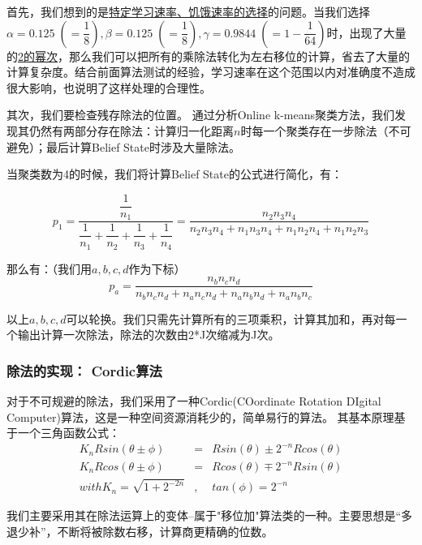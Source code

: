 首先，我们想到的是\uline{特定学习速率、饥饿速率的选择}的问题。当我们选择$\alpha = 0.125\;(=\dfrac{1}{8}),\beta = 0.125\;(=\dfrac{1}{8}), \gamma = 0.9844 \;(= 1- \dfrac{1}{64})$时，出现了大量的\uline{2的幂次}，那么我们可以把所有的乘除法转化为左右移位的计算，省去了大量的计算复杂度。结合前面算法测试的经验，学习速率在这个范围以内对准确度不造成很大影响，也说明了这样处理的合理性。

其次，我们要检查残存除法的位置。 通过分析Online k-means聚类方法，我们发现其仍然有两部分存在除法：计算归一化距离$n$时每一个聚类存在一步除法（不可避免）；最后计算Belief State时涉及大量除法。

当聚类数为4的时候，我们将计算Belief State的公式进行简化，有：

$$p_1 = \dfrac{\dfrac{1}{n_1}}{\dfrac{1}{n_1}+\dfrac{1}{n_2}+\dfrac{1}{n_3}+\dfrac{1}{n_4}} = \dfrac{n_2 n_3 n_4}{n_2 n_3 n_4 + n_1 n_3 n_4 + n_1 n_2 n_4 + n_1 n_2 n_3}$$

那么有：（我们用$a,b,c,d$作为下标）
\begin{equation}
p_a = \dfrac{n_b n_c n_d}{n_b n_c n_d + n_a n_c n_d + n_a n_b n_d + n_a n_b n_c}
\end{equation}

以上$a,b,c,d$可以轮换。我们只需先计算所有的三项乘积，计算其加和，再对每一个输出计算一次除法，除法的次数由2*J次缩减为J次。

\subsubsection{除法的实现： Cordic算法}

对于不可规避的除法，我们采用了一种Cordic(COordinate Rotation DIgital Computer)算法，这是一种空间资源消耗少的，简单易行的算法。 其基本原理基于一个三角函数公式：
\begin{equation}
\begin{aligned}
K_n R sin(\theta \pm \phi) & = & R sin(\theta) \pm 2^{-n} R cos(\theta) \\
K_n R cos(\theta \pm \phi) & = & R cos(\theta) \mp 2^{-n} R sin(\theta) \\
with K_n = \sqrt{1+2^{-2n}} & , & tan(\phi) = 2^{-n} 
\end{aligned}
\end{equation}

我们主要采用其在除法运算上的变体--属于"移位加"算法类的一种。主要思想是“多退少补”，不断将被除数右移，计算商更精确的位数。

